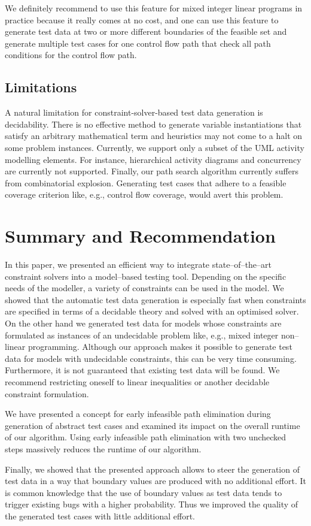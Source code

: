 \documentclass[runningheads,a4paper]{llncs}%
\begin{document}
We definitely recommend to use this feature for mixed integer linear programs in
practice because it really comes at no cost, and one can use this feature to
generate test data at two or more different boundaries of the feasible set and
generate multiple test cases for one control flow path that check all path
conditions for the control flow path.

\subsection{Limitations}
A natural limitation for constraint-solver-based test data generation is
decidability. There is no effective method to generate variable instantiations
that satisfy an arbitrary mathematical term and heuristics may not come to a halt on
some problem instances.
Currently, we support only a subset of the UML activity modelling
elements. For instance, hierarchical activity diagrams and concurrency are currently not
supported. 
Finally, our path search algorithm currently suffers
from combinatorial explosion. Generating test cases that adhere to a feasible
coverage criterion like, e.g., control flow coverage, would avert this problem.

\section{Summary and Recommendation}%
\label{sec:Recommendation}%
In this paper, we presented an efficient way to integrate state--of--the--art constraint
solvers into a model--based testing tool. Depending on the specific needs of the
modeller, a variety of constraints can be used in the model. 
We showed that the automatic test data generation is especially
fast when constraints are specified in terms of a decidable theory and solved
with an optimised solver. On the other hand we 
generated test data for models whose constraints are formulated as instances of
an undecidable problem like, e.g., mixed integer non--linear programming.
Although our approach makes it possible to generate test data for
models with undecidable constraints, this can be very time consuming.
Furthermore, it is not guaranteed that existing test data will be found. 
We recommend restricting
oneself to linear inequalities or another decidable constraint formulation.

We have presented a concept for early infeasible path elimination during
generation of abstract test cases and examined its impact on the overall runtime
of our algorithm. Using early infeasible path elimination with two unchecked
steps massively reduces the runtime of our algorithm.

Finally, we showed that the presented approach allows to steer the
generation of test data in a way that boundary values are produced with no
additional effort. It is common knowledge that the use of boundary values as
test data tends to trigger existing bugs with a higher probability. Thus we
improved the quality of the generated test cases with little additional effort.%

%
%
\end{document}
